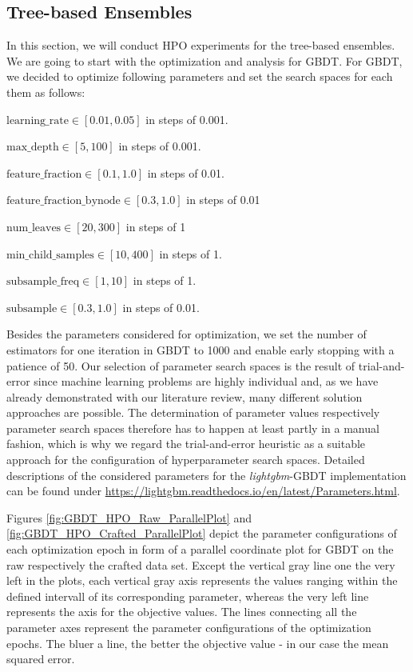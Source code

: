 \subsection{Tree-based Ensembles}

In this section, we will conduct HPO experiments for the tree-based ensembles. 
We are going to start with the optimization and analysis for GBDT.
For GBDT, we decided to optimize following parameters and set the search spaces for each them as follows:
\begin{description}[font=$\bullet$\scshape\bfseries]
	\item $ \text{learning\_rate} \in [0.01, 0.05] $  in steps of 0.001.
	\item $ \text{max\_depth} \in [5, 100] $ in steps of 0.001.
	\item $ \text{feature\_fraction} \in [0.1, 1.0] $ in steps of 0.01.
	\item $ \text{feature\_fraction\_bynode} \in [0.3, 1.0] $ in steps of 0.01
	\item $ \text{num\_leaves} \in [20, 300] $ in steps of 1
	\item $ \text{min\_child\_samples} \in [10, 400] $ in steps of 1.
	\item $ \text{subsample\_freq} \in [1, 10] $ in steps of 1.
	\item $ \text{subsample} \in [0.3, 1.0] $ in steps of 0.01.
\end{description}
Besides the parameters considered for optimization, we set the number of estimators for one iteration in GBDT to 1000 and enable early stopping with a patience of 50. Our selection of parameter search spaces is the result of trial-and-error since machine learning problems are highly individual and, as we have already demonstrated with our literature review, many different solution approaches are possible. The determination of parameter values respectively parameter search spaces therefore has to happen at least partly in a manual fashion, which is why we regard the trial-and-error heuristic as a suitable approach for the configuration of hyperparameter search spaces. Detailed descriptions of the considered parameters for the \textit{lightgbm}-GBDT implementation can be found under \url{https://lightgbm.readthedocs.io/en/latest/Parameters.html}.

Figures \ref{fig:GBDT_HPO_Raw_ParallelPlot} and \ref{fig:GBDT_HPO_Crafted_ParallelPlot} depict the parameter configurations of each optimization epoch in form of a parallel coordinate plot for GBDT on the raw respectively the crafted data set. Except the vertical gray line one the very left in the plots, each vertical gray axis represents the values ranging within the defined intervall of its corresponding parameter, whereas the very left line represents the axis for the objective values. The lines connecting all the parameter axes represent the parameter configurations of the optimization epochs. The bluer a line, the better the objective value - in our case the mean squared error. 

